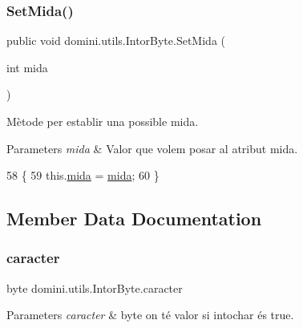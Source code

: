 \subsubsection{\texorpdfstring{Set\+Mida()}{SetMida()}}
{\footnotesize\ttfamily public void domini.\+utils.\+Intor\+Byte.\+Set\+Mida (\begin{DoxyParamCaption}\item[{int}]{mida }\end{DoxyParamCaption})\hspace{0.3cm}{\ttfamily [inline]}}



Mètode per establir una possible mida. 


\begin{DoxyParams}{Parameters}
{\em mida} & Valor que volem posar al atribut mida. \\
\hline
\end{DoxyParams}

\begin{DoxyCode}
58    \{
59       this.\hyperlink{classdomini_1_1utils_1_1IntorByte_a6dd2ad21efcfb2bcfff716f5e04794d9}{mida} = \hyperlink{classdomini_1_1utils_1_1IntorByte_a6dd2ad21efcfb2bcfff716f5e04794d9}{mida};
60    \}
\end{DoxyCode}


\subsection{Member Data Documentation}
\mbox{\label{classdomini_1_1utils_1_1IntorByte_adbb2e8c31ead2f27d85ff39683b9a8a7}} 
\subsubsection{\texorpdfstring{caracter}{caracter}}
{\footnotesize\ttfamily byte domini.\+utils.\+Intor\+Byte.\+caracter\hspace{0.3cm}{\ttfamily [private]}}


\begin{DoxyParams}{Parameters}
{\em caracter} & byte on té valor si intochar és true. \\
\hline
\end{DoxyParams}
\mbox{\label{classdomini_1_1utils_1_1IntorByte_a83872b8acc9ab187acbc2175d5bf320e}} 
